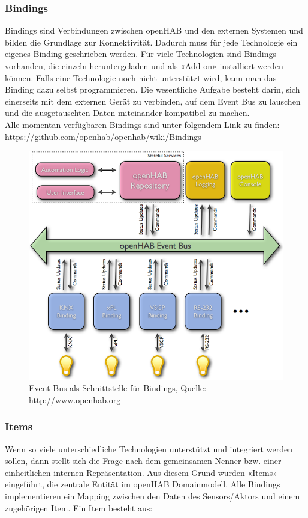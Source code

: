 \subsubsection{Bindings}
Bindings sind Verbindungen zwischen openHAB und den externen Systemen und bilden die Grundlage zur Konnektivität. Dadurch muss für jede Technologie ein eigenes Binding geschrieben werden. Für viele Technologien sind Bindings vorhanden, die einzeln heruntergeladen und als «Add-on» installiert werden können. Falls eine Technologie noch nicht unterstützt wird, kann man das Binding dazu selbst programmieren. Die wesentliche Aufgabe besteht darin, sich einerseits mit dem externen Gerät zu verbinden, auf dem Event Bus zu lauschen und die ausgetauschten Daten miteinander kompatibel zu machen. \\
Alle momentan verfügbaren Bindings sind unter folgendem Link zu finden: \url{https://github.com/openhab/openhab/wiki/Bindings}

\begin{figure}[H]
	\centering
		\includegraphics[scale=0.4]{report/img/communicationOH}
	\caption{Event Bus als Schnittstelle für Bindings, Quelle: \url{http://www.openhab.org}}
	\label{fig:ohComm}
\end{figure}



\subsubsection{Items}
Wenn so viele unterschiedliche Technologien unterstützt und integriert werden sollen, dann stellt sich die Frage nach dem gemeinsamen Nenner bzw. einer einheitlichen internen Repräsentation. Aus diesem Grund wurden «Items» eingeführt, die zentrale Entität im openHAB Domainmodell. Alle Bindings implementieren ein Mapping zwischen den Daten des Sensors/Aktors und einem zugehörigen Item. Ein Item besteht aus:

